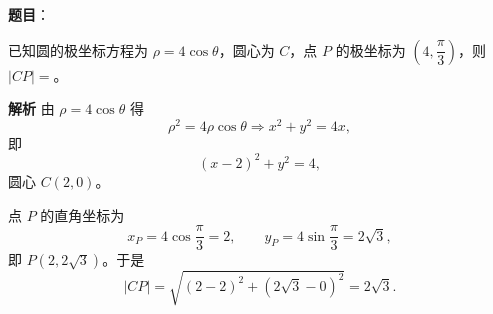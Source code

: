 \begin{answer}

\textbf{题目}：

已知圆的极坐标方程为 $\rho=4\cos\theta$，圆心为 $C$，点 $P$ 的极坐标为 $\left(4,\dfrac{\pi}{3}\right)$，则 $|CP|=$\gkblank{}。

\textbf{解析}
由 $\rho=4\cos\theta$ 得
\nopagebreak[4]
\[\rho^2=4\rho\cos\theta\Longrightarrow x^2+y^2=4x,\]
即
\nopagebreak[4]
\[(x-2)^2+y^2=4,\]
圆心 $C(2,0)$。

点 $P$ 的直角坐标为
\nopagebreak[4]
\[x_P=4\cos\frac\pi3=2,\qquad y_P=4\sin\frac\pi3=2\sqrt3,\]
即 $P(2,2\sqrt3)$。于是
\nopagebreak[4]
\[|CP|=\sqrt{(2-2)^2+(2\sqrt3-0)^2}=2\sqrt3.\]


\end{answer}
